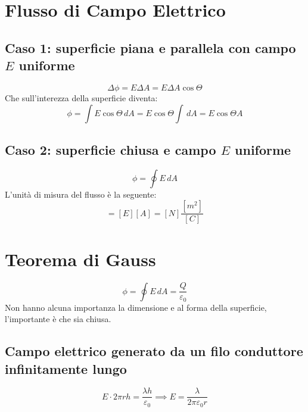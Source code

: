         \section*{Flusso di Campo Elettrico}
            \subsection*{Caso 1: superficie piana e parallela con campo $E$
            uniforme}
                \begin{equation*}
                    \Delta\phi = E \Delta A = E \Delta A \cos\Theta 
                \end{equation*}
            Che sull'interezza della superficie diventa:
                \begin{equation*}
                \phi = \int E\cos\Theta \,dA  = E\cos\Theta\int\,dA = E\cos
                \Theta A 
                \end{equation*}
            \subsection*{Caso 2: superficie chiusa e campo $E$ uniforme}
                \begin{equation*}
                    \phi = \oint E \,dA
                \end{equation*}
        L'unità di misura del flusso è la seguente:
                \begin{equation*}
                    [\phi] = [E][A] = [N] \frac{[m^2]}{[C]}
                \end{equation*}
         
        \section*{Teorema di Gauss}
            \begin{equation*}
                \phi = \oint E \, dA = \frac{Q}{\varepsilon_0}
            \end{equation*}
        Non hanno alcuna importanza la dimensione e al forma della superficie,
        l'importante è che sia chiusa.

            \subsection*{Campo elettrico generato da un filo conduttore 
            infinitamente lungo}
                \begin{equation*}
                    E \cdot 2\pi rh = \frac{\lambda h}{\varepsilon_0}
                    \implies
                    E = \frac{\lambda}{2\pi\varepsilon_0r}
                \end{equation*}

